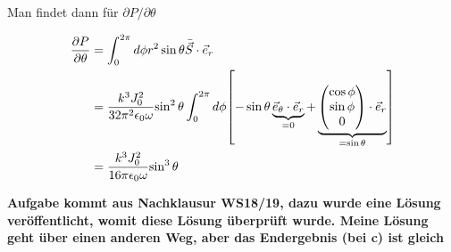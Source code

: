 \begin{enumerate}[label=\alph*)]
    Man findet dann für $\partial P/\partial \theta$

    \begin{equation}
      \begin{split}
        \pdv{P}{\theta}
        &=\int_0^{2\pi}d\phi r^2\sin\theta\bar{\vec S}\cdot\vec e_r\\
        &= \frac{k^3J_0^2}{32\pi^2\epsilon_0\omega} 
        {\sin^2\theta}
        \int_0^{2\pi}d\phi
        \qty[-\sin\theta \underbrace{\vec e_\theta\cdot\vec e_r}_{=0}+
        \underbrace{\begin{pmatrix}
          \cos\phi\\\sin\phi\\0
        \end{pmatrix}
        \cdot \vec e_r}_{=\sin\theta}
        ]\\
        &= \frac{k^3J_0^2}{16\pi\epsilon_0\omega} 
        {\sin^3\theta}
      \end{split}
    \end{equation}
    
  \vfill
  \textbf{Aufgabe kommt aus Nachklausur WS18/19, dazu wurde eine
  Lösung veröffentlicht, womit diese Lösung überprüft wurde. Meine
  Lösung geht über einen anderen Weg, aber das Endergebnis (bei c) 
ist gleich}
\end{enumerate}


